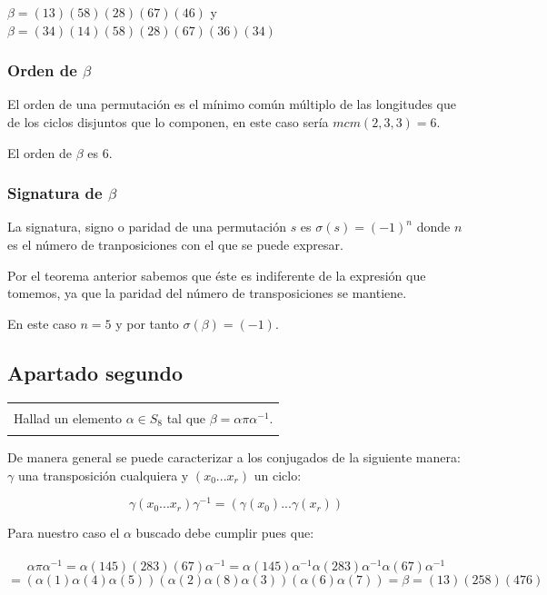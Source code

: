 \documentclass[12pt]{article}
\newenvironment{micaja}
{
    \begin{center}
    \begin{tabular}{|p{0.9\textwidth}|}
    \hline\\
    }   
    {   
    \\\\\hline
    \end{tabular} 
    \end{center}
    }
\begin{document}
$\beta = (1 3) (5 8) (2 8) (6 7)(4 6)$ y
$\beta = (3 4)(1 4) (5 8) (2 8) (6 7) (3 6) (3 4)$

\subsubsection*{Orden de $\beta$}

El orden de una permutación es el mínimo común múltiplo de las longitudes que 
de los ciclos disjuntos que lo componen, en este caso sería $mcm(2,3,3)=6.$

El orden de $\beta$ es 6.

\subsubsection*{Signatura de $\beta$}

La signatura, signo o paridad de una permutación $s$ es $\sigma(s) = (-1)^n$ donde $n$ es el número de tranposiciones con el que se puede expresar.

Por el teorema anterior sabemos que éste es indiferente de la expresión  que tomemos, ya que la 
paridad del número de transposiciones se mantiene.

En este caso $n=5$ y por tanto $\sigma(\beta) = (-1).$

\subsection{Apartado segundo}
\begin{micaja}
Hallad un elemento $\alpha  \in S_8$ tal que $\beta = \alpha \pi \alpha^{-1}.$
\end{micaja}
De manera general se puede caracterizar a los conjugados de la siguiente manera:
$\gamma$ una transposición cualquiera y $(x_0 ... x_r)$ un ciclo: 

$$\gamma (x_0 ... x_r) \gamma^{-1} = ( \gamma (x_0)... \gamma(x_r))$$

Para nuestro caso el $\alpha$ buscado debe cumplir pues que: \paragraph{}
\begin{equation*}   
\alpha \pi \alpha^{-1} = \alpha (145)(283)(67) \alpha^{-1} 
= \alpha (145)\alpha^{-1}\alpha(283)\alpha^{-1}\alpha(67)\alpha^{-1}
\end{equation*}
\begin{equation*}   
= (\alpha(1) \alpha(4)\alpha(5))(\alpha(2)\alpha(8)\alpha(3))(\alpha(6)\alpha(7))
= \beta =  (1 3) (2 5 8) (4 7 6)
\end{equation*}
\end{document}

